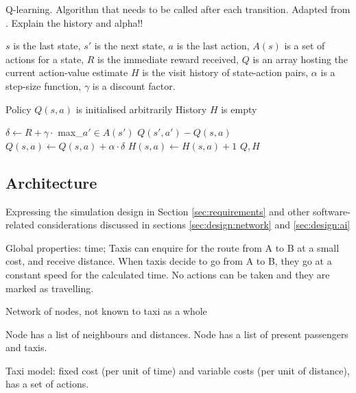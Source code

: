 \begin{algorithm}
  \caption{
  Q-learning. Algorithm that needs to be called after each transition. 
  Adapted from \textcite{Sutton1998ai+reinforcement}. Explain the history and alpha!!
  \label{algorithm:td:sarsa}}

  \begin{algorithmic}[1]
    \Require 
      \Statex $s$ is the last state,
      \Statex $s'$ is the next state,
      \Statex $a$ is the last action,
      \Statex $A(s)$ is a set of actions for a state,
      \Statex $R$ is the immediate reward received,
      \Statex $Q$ is an array hosting the current action-value estimate
      \Statex $H$ is the visit history of state-action pairs,
      \Statex $\alpha$ is a step-size function,
      \Statex $\gamma$ is a discount factor.

      \Statex Policy $Q(s, a)$ is initialised arbitrarily
      \Statex History $H$ is empty

      \State $\delta \gets R + 
              \gamma \cdot$ max\_{$a' \in A(s')$} $Q(s', a') - Q(s, a)$
      \State $Q(s, a) \gets Q(s, a) + \alpha \cdot \delta$
      \State $H(s, a) \gets H(s, a) + 1$
      \Return $Q, H$      
    \EndFunction
  \end{algorithmic}

\end{algorithm}

\subsection{Architecture} 
\label{sec:design:architecture}

Expressing the simulation design in Section \ref{sec:requirements} and
other software-related considerations discussed in sections
\ref{sec:design:network} and \ref{sec:design:ai}

Global properties: time; Taxis
can enquire for the route from A to B at a small cost, and receive distance.
When taxis decide to go from A to B, they go at a constant speed for the
calculated time. No actions can be taken and they are marked as travelling.

Network of nodes, not known to taxi as a whole

Node has a list of neighbours and distances.
Node has a list of present passengers and taxis.

Taxi model: fixed cost (per unit of time) and variable costs (per unit of
distance), has a set of actions.

